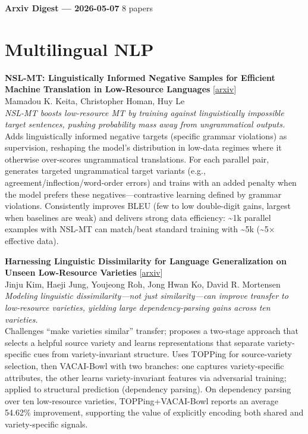 \documentclass[12pt,letterpaper]{article}
\begin{document}
{\footnotesize\textbf{Arxiv Digest --- 2026-05-07} \hfill 8 papers}

\smallskip

\section*{Multilingual NLP}

{\small\textbf{NSL-MT: Linguistically Informed Negative Samples for Efficient Machine Translation in Low-Resource Languages}} {\scriptsize[\href{https://arxiv.org/abs/2511.09537}{arxiv}]}\\
{\scriptsize Mamadou K. Keita, Christopher Homan, Huy Le}\\

{\small\textit{NSL-MT boosts low-resource MT by training against linguistically impossible target sentences, pushing probability mass away from ungrammatical outputs.}}\\[1pt]
{\footnotesize Adds linguistically informed negative targets (specific grammar violations) as supervision, reshaping the model's distribution in low-data regimes where it otherwise over-scores ungrammatical translations. For each parallel pair, generates targeted ungrammatical target variants (e.g., agreement/inflection/word-order errors) and trains with an added penalty when the model prefers these negatives---contrastive learning defined by grammar violations. Consistently improves BLEU (few to low double-digit gains, largest when baselines are weak) and delivers strong data efficiency: \textasciitilde{}1k parallel examples with NSL-MT can match/beat standard training with \textasciitilde{}5k (\textasciitilde{}5× effective data).}

\medskip

{\small\textbf{Harnessing Linguistic Dissimilarity for Language Generalization on Unseen Low-Resource Varieties}} {\scriptsize[\href{https://arxiv.org/abs/2605.04500}{arxiv}]}\\
{\scriptsize Jinju Kim, Haeji Jung, Youjeong Roh, Jong Hwan Ko, David R. Mortensen}\\

{\small\textit{Modeling linguistic dissimilarity---not just similarity---can improve transfer to low-resource varieties, yielding large dependency-parsing gains across ten varieties.}}\\[1pt]
{\footnotesize Challenges ``make varieties similar'' transfer; proposes a two-stage approach that selects a helpful source variety and learns representations that separate variety-specific cues from variety-invariant structure. Uses TOPPing for source-variety selection, then VACAI-Bowl with two branches: one captures variety-specific attributes, the other learns variety-invariant features via adversarial training; applied to structural prediction (dependency parsing). On dependency parsing over ten low-resource varieties, TOPPing+VACAI-Bowl reports an average 54.62\% improvement, supporting the value of explicitly encoding both shared and variety-specific signals.}
\end{document}
